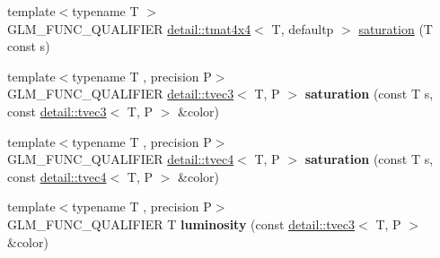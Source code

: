 \begin{DoxyCompactItemize}
\item 
{\footnotesize template$<$typename T $>$ }\\G\+L\+M\+\_\+\+F\+U\+N\+C\+\_\+\+Q\+U\+A\+L\+I\+F\+I\+ER \hyperlink{structglm_1_1detail_1_1tmat4x4}{detail\+::tmat4x4}$<$ T, defaultp $>$ \hyperlink{group__gtx__color__space_ga444bcc8582eaa894acf405762ba2a5ff}{saturation} (T const s)
\item 
{\footnotesize template$<$typename T , precision P$>$ }\\G\+L\+M\+\_\+\+F\+U\+N\+C\+\_\+\+Q\+U\+A\+L\+I\+F\+I\+ER \hyperlink{structglm_1_1detail_1_1tvec3}{detail\+::tvec3}$<$ T, P $>$ {\bfseries saturation} (const T s, const \hyperlink{structglm_1_1detail_1_1tvec3}{detail\+::tvec3}$<$ T, P $>$ \&color)\hypertarget{namespaceglm_a463c379951b5f548d36c0ee0eea1ce87}{}\label{namespaceglm_a463c379951b5f548d36c0ee0eea1ce87}

\item 
{\footnotesize template$<$typename T , precision P$>$ }\\G\+L\+M\+\_\+\+F\+U\+N\+C\+\_\+\+Q\+U\+A\+L\+I\+F\+I\+ER \hyperlink{structglm_1_1detail_1_1tvec4}{detail\+::tvec4}$<$ T, P $>$ {\bfseries saturation} (const T s, const \hyperlink{structglm_1_1detail_1_1tvec4}{detail\+::tvec4}$<$ T, P $>$ \&color)\hypertarget{namespaceglm_a89815e8c2c16b282187b2ecddec3d2d7}{}\label{namespaceglm_a89815e8c2c16b282187b2ecddec3d2d7}

\item 
{\footnotesize template$<$typename T , precision P$>$ }\\G\+L\+M\+\_\+\+F\+U\+N\+C\+\_\+\+Q\+U\+A\+L\+I\+F\+I\+ER T {\bfseries luminosity} (const \hyperlink{structglm_1_1detail_1_1tvec3}{detail\+::tvec3}$<$ T, P $>$ \&color)\hypertarget{namespaceglm_a4b04f184e67e6a7b9d10d5284d1e72da}{}\label{namespaceglm_a4b04f184e67e6a7b9d10d5284d1e72da}


\end{DoxyCompactItemize}
